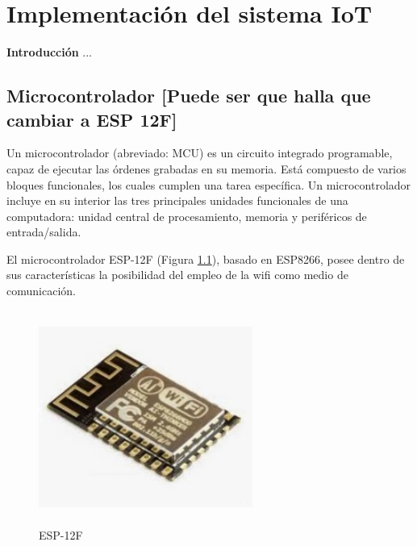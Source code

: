 \chapter{Implementación del sistema IoT}\label{cap: }

        \textbf{\Large Introducción}\newline
        ...\\

\section{Microcontrolador [Puede ser que halla que cambiar a ESP 12F]} \label{sec: microcontrolador}

    Un microcontrolador (abreviado: MCU) es un circuito integrado programable, capaz de ejecutar las órdenes grabadas en su memoria. Está compuesto de varios bloques funcionales, los cuales cumplen una tarea específica. Un microcontrolador incluye en su interior las tres principales unidades funcionales de una computadora: unidad central de procesamiento, memoria y periféricos de entrada/salida.\\

    \vspace{7cm}

    El microcontrolador ESP-12F (Figura \ref{imag:esp-12F}), basado en ESP8266, posee dentro de sus características la posibilidad del empleo de la wifi como medio de comunicación.\\

    \begin{figure}[h]
        \centering
        \includegraphics[width=7cm, height=7cm]{imagenes/esp-12F.jpeg}
        \caption{ESP-12F}
        \label{imag:esp-12F}
    \end{figure}

